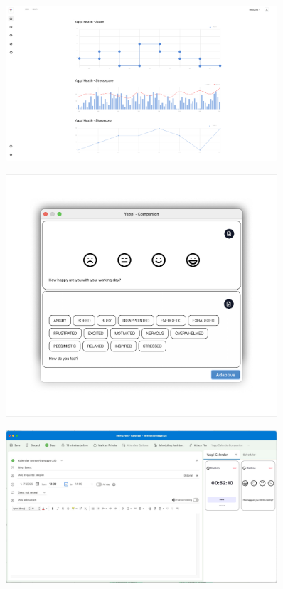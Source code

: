 \documentclass[12pt,a4paper]{report}
\begin{document}
\begin{appendices}
    \begin{figure}[H]
      \centering
      \includegraphics[width=0.90\textwidth]{../figures/mockup/IP5_Yappi_Companion_Health.pdf}
    \end{figure}

    \begin{figure}[H]
    \centering
    \includegraphics[width=0.90\textwidth]{../figures/mockup/IP5_Yappi_Companion_Intellij.pdf}
    \end{figure}

    \begin{figure}[H]
    \centering
    \includegraphics[width=0.90\textwidth]{../figures/mockup/IP5_Yappi_Companion_Outlook_Prototype.pdf}
    \end{figure}


\end{appendices}
\end{document}
